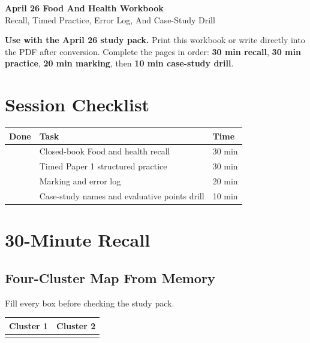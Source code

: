 \documentclass[11pt,a4paper]{article}
\newcommand{\term}[1]{\textcolor{HeadingBlue}{\textbf{#1}}}
\newcommand{\todobox}{\fbox{\rule{0pt}{0.8em}\rule{0.8em}{0pt}}}
\begin{document}
\begin{center}
{\sffamily\bfseries\color{HeadingBlue}\LARGE April 26 Food And Health Workbook}\\[0.25em]
{\sffamily\color{AccentTeal}\large Recall, Timed Practice, Error Log, And Case-Study Drill}
\end{center}

\noindent\colorbox{SoftBlue}{%
\begin{minipage}{0.965\textwidth}
\sffamily
\textbf{\textcolor{HeadingBlue}{Use with the April 26 study pack.}}
Print this workbook or write directly into the PDF after conversion. Complete
the pages in order: \term{30 min recall}, \term{30 min practice},
\term{20 min marking}, then \term{10 min case-study drill}.
\end{minipage}
}

\section{Session Checklist}

\begin{tabularx}{\textwidth}{L{0.12\textwidth}Y L{0.18\textwidth}}
\toprule
\textbf{Done} & \textbf{Task} & \textbf{Time} \\
\midrule
\todobox & Closed-book Food and health recall & 30 min \\
\todobox & Timed Paper 1 structured practice & 30 min \\
\todobox & Marking and error log & 20 min \\
\todobox & Case-study names and evaluative points drill & 10 min \\
\bottomrule
\end{tabularx}

\section{30-Minute Recall}

\subsection{Four-Cluster Map From Memory}

Fill every box before checking the study pack.

\begin{tabularx}{\textwidth}{Y Y}
\toprule
\textbf{\textcolor{HeadingBlue}{Cluster 1}} &
\textbf{\textcolor{HeadingBlue}{Cluster 2}} \\
\midrule
\rule{0pt}{4.3cm} & \rule{0pt}{4.3cm} \\
\bottomrule
\end{tabularx}
\end{document}
